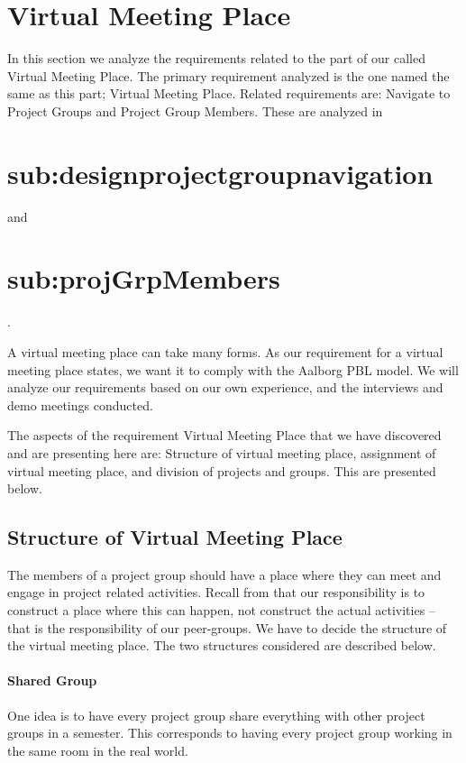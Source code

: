 \section{Virtual Meeting Place}
\label{sec:virtualMeetingPlace}
\label{sec:projectgroup}
In this section we analyze the requirements related to the part of our \subsystem{} called Virtual Meeting Place.
The primary requirement analyzed is the one named the same as this part; Virtual Meeting Place.
Related requirements are: Navigate to Project Groups and Project Group Members.
These are analyzed in \section{sub:designprojectgroupnavigation} and \section{sub:projGrpMembers}.

A virtual meeting place can take many forms.
As our requirement for a virtual meeting place states, we want it to comply with the Aalborg PBL model.
We will analyze our requirements based on our own experience, and the interviews and demo meetings conducted.

The aspects of the requirement Virtual Meeting Place that we have discovered and are presenting here are: Structure of virtual meeting place, assignment of virtual meeting place, and division of projects and groups.
This are presented below.


\subsection{Structure of Virtual Meeting Place}
The members of a project group should have a place where they can meet and engage in project related activities.
Recall from  that our responsibility is to construct a place where this can happen, not construct the actual activities -- that is the responsibility of our peer-groups.
We have to decide the structure of the virtual meeting place.
The two structures considered are described below.

\paragraph{Shared Group} One idea is to have every project group share everything with other project groups in a semester.
This corresponds to having every project group working in the same room in the real world.

